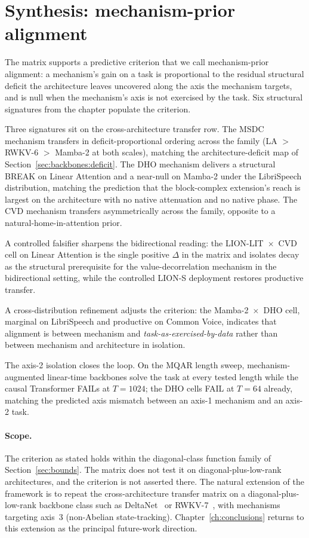\section{Synthesis: mechanism-prior alignment}\label{sec:experiments:synthesis}

The matrix supports a predictive criterion that we call
mechanism-prior alignment: a mechanism's gain on a task is
proportional to the residual structural deficit the
architecture leaves uncovered along the axis the mechanism
targets, and is null when the mechanism's axis is not
exercised by the task. Six structural signatures from the
chapter populate the criterion.

Three signatures sit on the cross-architecture transfer row.
The MSDC mechanism transfers in deficit-proportional ordering
across the family (LA $>$ RWKV-6 $>$ Mamba-2 at both scales),
matching the architecture-deficit map of
Section~\ref{sec:backbones:deficit}. The DHO mechanism
delivers a structural BREAK on Linear Attention and a
near-null on Mamba-2 under the LibriSpeech distribution,
matching the prediction that the block-complex extension's
reach is largest on the architecture with no native
attenuation and no native phase. The CVD mechanism transfers
asymmetrically across the family, opposite to a
natural-home-in-attention prior.

A controlled falsifier sharpens the bidirectional reading: the
LION-LIT~$\times$~CVD cell on Linear Attention is the single
positive $\Delta$ in the matrix and isolates decay as the
structural prerequisite for the value-decorrelation mechanism
in the bidirectional setting, while the controlled LION-S
deployment restores productive transfer.

A cross-distribution refinement adjusts the criterion: the
Mamba-2~$\times$~DHO cell, marginal on LibriSpeech and
productive on Common Voice, indicates that alignment is between
mechanism and \textit{task-as-exercised-by-data} rather than
between mechanism and architecture in isolation.

The axis-2 isolation closes the loop. On the MQAR length sweep,
mechanism-augmented linear-time backbones solve the task at
every tested length while the causal Transformer FAILs at
$T = 1024$; the DHO cells FAIL at $T = 64$ already, matching
the predicted axis mismatch between an axis-1 mechanism and
an axis-2 task.

\paragraph{Scope.} The criterion as stated holds within the
diagonal-class function family of
Section~\ref{sec:bounds}. The matrix does not test it on
diagonal-plus-low-rank architectures, and the criterion is
not asserted there. The natural extension of the framework is
to repeat the cross-architecture transfer matrix on a
diagonal-plus-low-rank backbone class such as
DeltaNet~\cite{schlag2021deltanet, yang2024deltanet} or
RWKV-7~\cite{peng2025rwkv7}, with mechanisms targeting axis~3
(non-Abelian state-tracking).
Chapter~\ref{ch:conclusions} returns to this extension as the
principal future-work direction.
